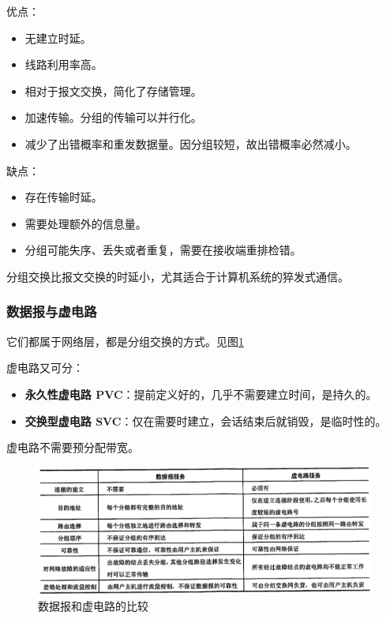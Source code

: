 \documentclass[12pt, a4paper, oneside]{ctexart}
\begin{document}
\begin{enumerate}
    优点：
    \begin{itemize}
        \item 无建立时延。
        \item 线路利用率高。
        \item 相对于报文交换，简化了存储管理。
        \item 加速传输。分组的传输可以并行化。
        \item 减少了出错概率和重发数据量。因分组较短，故出错概率必然减小。
    \end{itemize}
    缺点：
    \begin{itemize}
        \item 存在传输时延。
        \item 需要处理额外的信息量。
        \item 分组可能失序、丢失或者重复，需要在接收端重排检错。
    \end{itemize}
    分组交换比报文交换的时延小，尤其适合于计算机系统的猝发式通信。
\end{enumerate}

\subsubsection{数据报与虚电路}

它们都属于网络层，都是分组交换的方式。见图\ref{comp-between-datagram-and-virtual}

虚电路又可分：
\begin{itemize}
    \item {\bf 永久性虚电路 PVC}：提前定义好的，几乎不需要建立时间，是持久的。
    \item {\bf 交换型虚电路 SVC}：仅在需要时建立，会话结束后就销毁，是临时性的。
\end{itemize}

虚电路不需要预分配带宽。

\begin{figure}
    \centering
    \includegraphics[width=\textwidth]{./images/datagram_and_virtual_circuit.png}
    \caption{数据报和虚电路的比较}
    \label{comp-between-datagram-and-virtual}
\end{figure}
\end{document}
